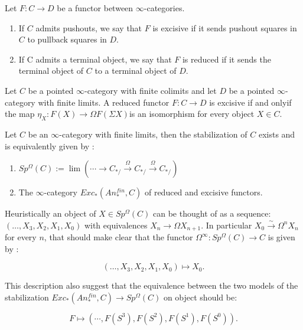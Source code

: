 \begin{definition}
    Let $F: C \to D$ be a functor between $\infty$-categories.
    \begin{enumerate}[label=\arabic*)]
        \item If $C$ admits pushouts, we say that $F$ is excisive if it sends pushout squares in $C$ to pullback squares in $D$. 
        \item If C admits a terminal object, we say that $F$ is reduced if it sends the terminal object of  $C$ to a terminal object of $D$.
    \end{enumerate} 
\end{definition}

\begin{proposition}
\label{Excisiveness criterion}
    Let $C$ be a pointed $\infty$-category with finite colimits and
let $D$ be a pointed $\infty$-category with finite limits. A reduced functor $F:C\to D$ is excisive if and
onlyif the map $\eta_X\colon F(X)\to\Omega F(\Sigma X)$is an isomorphism for every object $X\in C$.
\end{proposition}

\begin{theorem}
    Let $C$ be an $\infty$-category with finite limits, then the stabilization of $C$ exists  and is equivalently given by :
    \begin{enumerate}
        \item $Sp^\Omega(C):=\lim(\cdots\to C_{*/}\overset{\Omega}{\longrightarrow} C_{*/}\overset{\Omega}{\longrightarrow}C_{*/})$
        \item The $\infty$-category $Exc_*(An_*^{fin},C)$ of reduced and excisive functors. 
    \end{enumerate}
\end{theorem}

Heuristically an object of $X\in Sp^\Omega(C)$ can be thought of as a sequence:
$(\ldots, X_3,X_2,X_1,X_0)$ with equivalences $ X_n\to \Omega X_{n+1}$. In particular $X_0\overset{\sim}{\to}\Omega^n X_n$ for every $n$, that should make clear that the functor $\Omega^\infty:Sp^\Omega(C)\to C$ is given by :

\[(\ldots, X_3,X_2,X_1,X_0)\mapsto X_0.\]

This description also suggest that the equivalence between the two models of the stabilization $Exc_*(An_*^{fin},C)\to Sp^\Omega(C)$ on object should be:

\[F\mapsto(\cdots,F(S^3),F(S^2),F(S^1),F(S^0)).\]

